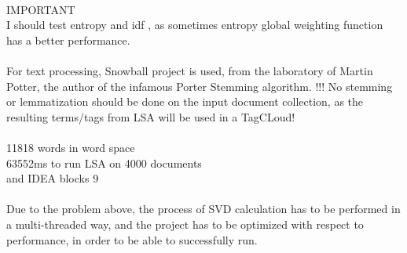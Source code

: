 \\
IMPORTANT\\
I should test entropy and idf , as sometimes entropy global weighting function has a better performance.\\ 
\\
For text processing, Snowball project is used, from the laboratory of Martin Potter, the author of the infamous Porter Stemming algorithm.
!!! No stemming or lemmatization should be done on the input document collection, as the resulting terms/tags from LSA will be used in a TagCLoud!\\
\\

11818 words in word space\\
 63552ms to run LSA on 4000 documents\\
and IDEA blocks 9\\
\\
Due to the problem above, the process of SVD calculation has to be performed in a multi-threaded way, and the project has to be optimized with respect to performance, in order to be able to successfully run.

